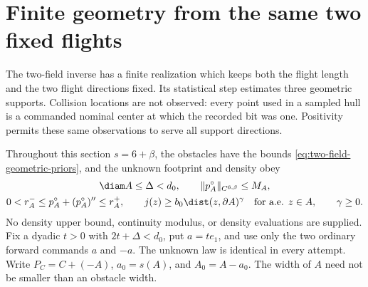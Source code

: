 \section{Finite geometry from the same two fixed flights}
\label{sec:two-field-finite}
The two-field inverse has a finite realization which keeps both the
flight length and the two flight directions fixed.  Its statistical
step estimates three geometric supports.  Collision locations are not
observed: every point used in a sampled hull is a commanded nominal
center at which the recorded bit was one.  Positivity permits these
same observations to serve all support directions.

Throughout this section $s=6+\beta$, the obstacles have the bounds
\eqref{eq:two-field-geometric-priors}, and the unknown footprint and density obey
\begin{equation}\label{eq:two-field-finite-priors}
 \begin{gathered}
 \diam A\le\Delta<d_0,\qquad
 \|p_A^\circ\|_{C^{6,\beta}}\le M_A,\\
 0<r_A^-\le p_A^\circ+(p_A^\circ)''\le r_A^+,
 \qquad j(z)\ge b_0\dist(z,\partial A)^\gamma
       \quad\hbox{for a.e. }z\in A,
 \qquad \gamma\ge0.
 \end{gathered}
\end{equation}
No density upper bound, continuity modulus, or density evaluations are
supplied.  Fix a dyadic $t>0$ with $2t+\Delta<d_0$, put $a=te_1$,
and use only the two ordinary forward commands $a$ and $-a$.
The unknown law is identical in every attempt.  Write
$P_C=C+(-A)$, $a_0=s(A)$, and $A_0=A-a_0$.
The width of $A$ need not be smaller than an obstacle width.

